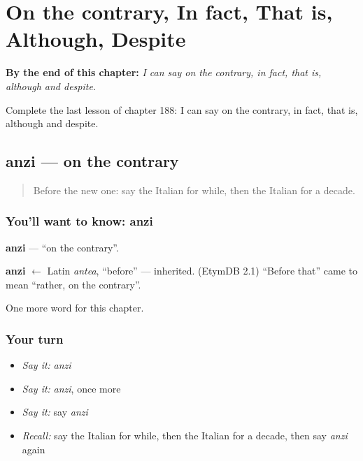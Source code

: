 
\chapter{On the contrary, In fact, That is, Although, Despite}
\label{ch:it-on-the-contrary-in-fact-that-is-although-despite}

\begin{chapteropening}
\textbf{By the end of this chapter:} \emph{I can say on the contrary, in fact, that is, although and despite.}

Complete the last lesson of chapter 188: I can say on the contrary, in fact, that is, although and despite.
\end{chapteropening}

\section[anzi]{anzi — on the contrary}

\label{lesson:IT-C188-anzi}



\begin{quote}
Before the new one: say the Italian for while, then the Italian for a decade.
\end{quote}

\subsection*{You'll want to know: anzi}
\textbf{anzi} — \textquotedblleft{}on the contrary\textquotedblright{}.

\begin{cousinweb}
\textbf{anzi} $\leftarrow$ Latin \emph{antea}, \textquotedblleft{}before\textquotedblright{} — inherited. (EtymDB 2.1) \textquotedblleft{}Before that\textquotedblright{} came to mean \textquotedblleft{}rather, on the contrary\textquotedblright{}.
\end{cousinweb}

\begin{grammarlens}[title={What you've built}]
One more word for this chapter.
\end{grammarlens}

\subsection*{Your turn}
\begin{itemize}
\raggedright
  \item \emph{Say it:} \emph{anzi}
  \item \emph{Say it:} \emph{anzi}, once more
  \item \emph{Say it:} say \emph{anzi}
  \item \emph{Recall:} say the Italian for while, then the Italian for a decade, then say \emph{anzi} again
\end{itemize}

